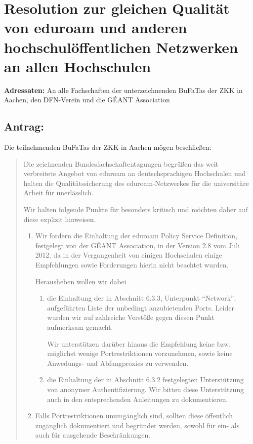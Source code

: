 \documentclass[12pt,oneside]{scrartcl}
\begin{document}
\section*{Resolution zur gleichen Qualität von  eduroam und anderen
  hochschulöffentlichen Netzwerken an allen Hochschulen}

\textbf{Adressaten:} An alle Fachschaften der unterzeichnenden BuFaTas der ZKK
in Aachen, den DFN-Verein und die GÉANT Association

\subsection*{Antrag:}
Die teilnehmenden BuFaTas der ZKK in Aachen mögen beschließen:
\begin{quote}
  Die zeichnenden Bundesfachschaftentagungen begrüßen das weit verbreitete
  Angebot von eduroam an deutschsprachigen Hochschulen und halten die
  Qualitätssicherung des eduroam-Netzwerkes für die universitäre Arbeit für
  unerlässlich.

  Wir halten folgende Punkte für besonders kritisch und möchten daher auf diese
  explizit hinweisen.

  \begin{enumerate}
  \item Wir fordern die Einhaltung der eduroam Policy Service Definition,
    festgelegt von der GÉANT Association, in der Version 2.8 vom Juli 2012, da
    in der Vergangenheit von einigen Hochschulen einige Empfehlungen sowie
    Forderungen hierin nicht beachtet wurden.

    Herausheben wollen wir dabei
    \begin{enumerate}
    \item  die Einhaltung der in Abschnitt 6.3.3, Unterpunkt ``Network'',
      aufgeführten Liste der unbedingt anzubietenden Ports. Leider wurden wir
      auf zahlreiche Verstöße gegen diesen Punkt aufmerksam gemacht.

      Wir unterstützen darüber hinaus die Empfehlung keine
      bzw. möglichst wenige Portrestriktionen vorzunehmen, sowie keine
      Anwedungs- und Abfangproxies zu verwenden.

    \item die Einhaltung der in Abschnitt 6.3.2 festgelegten Unterstützung von
      anonymer Authentifizierung. Wir bitten diese Unterstützung auch in den
      entsprechenden Anleitungen zu dokumentieren.
    \end{enumerate}
  \item Falls Portrestriktionen unumgänglich sind, sollten diese öffentlich
    zugänglich dokumentiert und begründet werden, sowohl für ein- als auch für
    ausgehende Beschränkungen.


\end{enumerate}
\end{quote}
\end{document}

